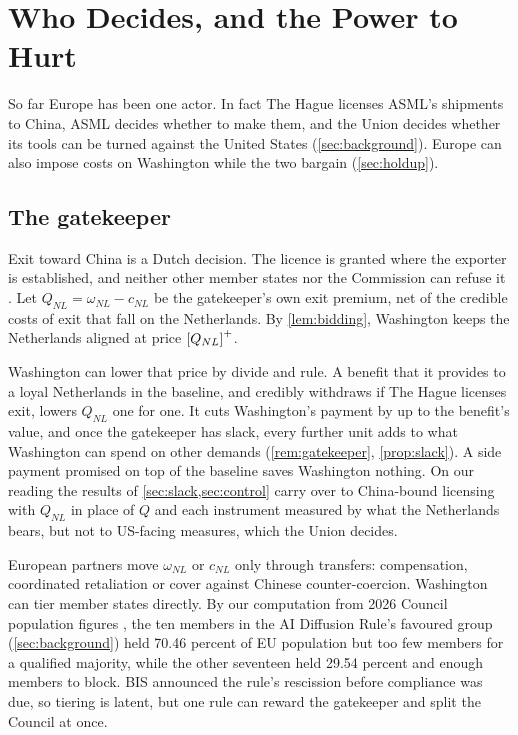 \section{Who Decides, and the Power to Hurt}\label{sec:decide}

So far Europe has been one actor. In fact The Hague licenses ASML's shipments to China, ASML decides whether to make them, and the Union decides whether its tools can be turned against the United States (\cref{sec:background}). Europe can also impose costs on Washington while the two bargain (\cref{sec:holdup}).

\subsection{The gatekeeper}\label{sec:gatekeeper}

Exit toward China is a Dutch decision. The licence is granted where the exporter is established, and neither other member states nor the Commission can refuse it \citep{eu2021dualuse}. Let $Q_{NL}=\omega_{NL}-c_{NL}$ be the gatekeeper's own exit premium, net of the credible costs of exit that fall on the Netherlands. By \cref{lem:bidding}, Washington keeps the Netherlands aligned at price $\left[Q_{NL}\right]^{+}$.

Washington can lower that price by divide and rule. A benefit that it provides to a loyal Netherlands in the baseline, and credibly withdraws if The Hague licenses exit, lowers $Q_{NL}$ one for one. It cuts Washington's payment by up to the benefit's value, and once the gatekeeper has slack, every further unit adds to what Washington can spend on other demands (\cref{rem:gatekeeper}, \cref{prop:slack}). A side payment promised on top of the baseline saves Washington nothing. On our reading the results of \cref{sec:slack,sec:control} carry over to China-bound licensing with $Q_{NL}$ in place of $Q$ and each instrument measured by what the Netherlands bears, but not to US-facing measures, which the Union decides.

European partners move $\omega_{NL}$ or $c_{NL}$ only through transfers: compensation, coordinated retaliation or cover against Chinese counter-coercion. Washington can tier member states directly. By our computation from 2026 Council population figures \citep{council2025population}, the ten members in the AI Diffusion Rule's favoured group (\cref{sec:background}) held 70.46 percent of EU population but too few members for a qualified majority, while the other seventeen held 29.54 percent and enough members to block. BIS announced the rule's rescission before compliance was due, so tiering is latent, but one rule can reward the gatekeeper and split the Council at once.

